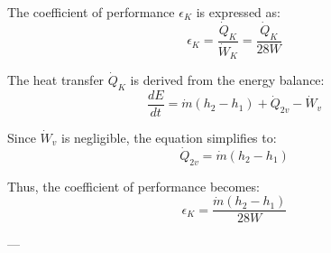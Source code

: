The coefficient of performance \( \epsilon_K \) is expressed as:  
\[
\epsilon_K = \frac{\dot{Q}_K}{\dot{W}_K} = \frac{\dot{Q}_K}{28W}
\]

The heat transfer \( \dot{Q}_K \) is derived from the energy balance:  
\[
\frac{dE}{dt} = \dot{m}(h_2 - h_1) + \dot{Q}_{2v} - \dot{W}_v
\]

Since \( \dot{W}_v \) is negligible, the equation simplifies to:  
\[
\dot{Q}_{2v} = \dot{m}(h_2 - h_1)
\]

Thus, the coefficient of performance becomes:  
\[
\epsilon_K = \frac{\dot{m}(h_2 - h_1)}{28W}
\]

---